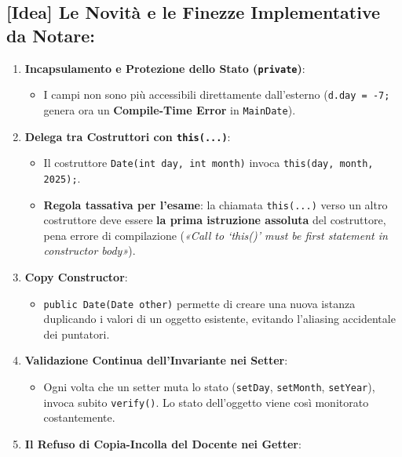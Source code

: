 \documentclass[11pt,a4paper,oneside]{report}
\newcommand{\passthrough}[1]{#1}
\providecommand{\tightlist}{\setlength{\itemsep}{0pt}\setlength{\parskip}{0pt}}
\begin{document}
\subsection{{[}Idea{]} Le Novità e le Finezze Implementative da
Notare:}\label{chap06_idea-le-novituxe0-e-le-finezze-implementative-da-notare}

\begin{enumerate}
\def\labelenumi{\arabic{enumi}.}
\item
  \textbf{Incapsulamento e Protezione dello Stato
  (\passthrough{\lstinline!private!})}:

  \begin{itemize}
  \tightlist
  \item
    I campi non sono più accessibili direttamente dall'esterno
    (\passthrough{\lstinline!d.day = -7;!} genera ora un
    \textbf{Compile-Time Error} in \passthrough{\lstinline!MainDate!}).
  \end{itemize}
\item
  \textbf{Delega tra Costruttori con
  \passthrough{\lstinline!this(...)!}}:

  \begin{itemize}
  \tightlist
  \item
    Il costruttore \passthrough{\lstinline!Date(int day, int month)!}
    invoca \passthrough{\lstinline!this(day, month, 2025);!}.
  \item
    \textbf{Regola tassativa per l'esame}: la chiamata
    \passthrough{\lstinline!this(...)!} verso un altro costruttore deve
    essere \textbf{la prima istruzione assoluta} del costruttore, pena
    errore di compilazione (\emph{«Call to `this()' must be first
    statement in constructor body»}).
  \end{itemize}
\item
  \textbf{Copy Constructor}:

  \begin{itemize}
  \tightlist
  \item
    \passthrough{\lstinline!public Date(Date other)!} permette di creare
    una nuova istanza duplicando i valori di un oggetto esistente,
    evitando l'aliasing accidentale dei puntatori.
  \end{itemize}
\item
  \textbf{Validazione Continua dell'Invariante nei Setter}:

  \begin{itemize}
  \tightlist
  \item
    Ogni volta che un setter muta lo stato
    (\passthrough{\lstinline!setDay!},
    \passthrough{\lstinline!setMonth!},
    \passthrough{\lstinline!setYear!}), invoca subito
    \passthrough{\lstinline!verify()!}. Lo stato dell'oggetto viene così
    monitorato costantemente.
  \end{itemize}
\item
  \textbf{Il Refuso di Copia-Incolla del Docente nei Getter}:


\end{enumerate}
\end{document}
